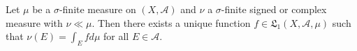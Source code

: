 Let $\mu$ be a $\sigma$-finite measure on $(X, \mathcal{A})$ and $\nu$ a $\sigma$-finite signed or complex measure with $\nu \ll \mu$. Then there exists a unique function $f \in \mathfrak{L}_1(X, \mathcal{A}, \mu)$ such that $\nu(E) = \int_E f d\mu$ for all $E \in \mathcal{A}$.

